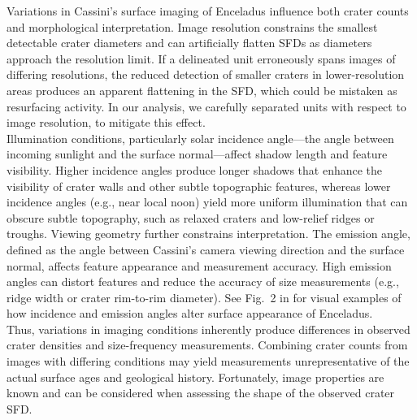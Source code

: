 \documentclass[preprint,11pt,3p,times,authoryear]{elsarticle}
\begin{document}
Variations in Cassini's surface imaging of Enceladus influence both crater counts and morphological interpretation. Image resolution constrains the smallest detectable crater diameters and can artificially flatten SFDs as diameters approach the resolution limit. If a delineated unit erroneously spans images of differing resolutions, the reduced detection of smaller craters in lower-resolution areas produces an apparent flattening in the SFD, which could be mistaken as resurfacing activity. In our analysis, we carefully separated units with respect to image resolution, to mitigate this effect.\\

Illumination conditions, particularly solar incidence angle—the angle between incoming sunlight and the surface normal—affect shadow length and feature visibility. Higher incidence angles produce longer shadows that enhance the visibility of crater walls and other subtle topographic features, whereas lower incidence angles (e.g., near local noon) yield more uniform illumination that can obscure subtle topography, such as relaxed craters and low-relief ridges or troughs.
Viewing geometry further constrains interpretation. The emission angle, defined as the angle between Cassini's camera viewing direction and the surface normal, affects feature appearance and measurement accuracy. High emission angles can distort features and reduce the accuracy of size measurements (e.g., ridge width or crater rim-to-rim diameter). See Fig.~2 in \citet{Bland2018} for visual examples of how incidence and emission angles alter surface appearance of Enceladus.\\

Thus, variations in imaging conditions inherently produce differences in observed crater densities and size-frequency measurements. Combining crater counts from images with differing conditions may yield measurements unrepresentative of the actual surface ages and geological history. Fortunately, image properties are known and can be considered when assessing the shape of the observed crater SFD. 
\end{document}
